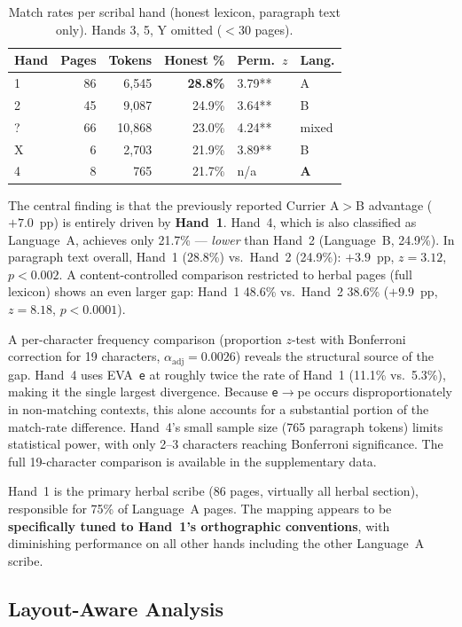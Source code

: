 \documentclass[11pt,a4paper]{article}
\newcommand{\eva}[1]{\texttt{#1}}
\begin{document}
\begin{table}[htbp]
\centering
\caption{Match rates per scribal hand (honest lexicon, paragraph text only).
Hands 3, 5, Y omitted ($<$30 pages).}
\label{tab:scribes}
\small
\begin{tabular}{@{}lrrrll@{}}
\toprule
Hand & Pages & Tokens & Honest \% & Perm.\ $z$ & Lang. \\
\midrule
1 & 86 & 6,545 & \textbf{28.8\%} & 3.79** & A \\
2 & 45 & 9,087 & 24.9\% & 3.64** & B \\
? & 66 & 10,868 & 23.0\% & 4.24** & mixed \\
X & 6 & 2,703 & 21.9\% & 3.89** & B \\
4 & 8 & 765 & 21.7\% & n/a & \textbf{A} \\
\bottomrule
\end{tabular}
\end{table}

The central finding is that the previously reported Currier A$>$B advantage
($+7.0$~pp) is entirely driven by \textbf{Hand~1}. Hand~4, which is also
classified as Language~A, achieves only 21.7\% --- \emph{lower} than Hand~2
(Language~B, 24.9\%). In paragraph text overall,
Hand~1 (28.8\%) vs.\ Hand~2 (24.9\%): $+3.9$~pp, $z=3.12$, $p<0.002$.
A content-controlled comparison restricted to herbal pages (full lexicon)
shows an even larger gap: Hand~1 48.6\% vs.\ Hand~2 38.6\%
($+9.9$~pp, $z=8.18$, $p<0.0001$).

A per-character frequency comparison (proportion $z$-test with Bonferroni
correction for 19 characters, $\alpha_{\mathrm{adj}} = 0.0026$)
reveals the structural source of the gap. Hand~4 uses EVA~\eva{e}
at roughly twice the rate of Hand~1 (11.1\% vs.\ 5.3\%), making it the
single largest divergence. Because \eva{e}$\to$pe occurs
disproportionately in non-matching contexts, this alone accounts for a
substantial portion of the match-rate difference. Hand~4's small sample
size (765 paragraph tokens) limits statistical power, with only 2--3
characters reaching Bonferroni significance. The full 19-character
comparison is available in the supplementary data.

Hand~1 is the primary herbal scribe (86 pages, virtually all herbal section),
responsible for 75\% of Language~A pages. The mapping appears to be
\textbf{specifically tuned to Hand~1's orthographic conventions}, with
diminishing performance on all other hands including the other Language~A
scribe.

\subsection{Layout-Aware Analysis}
\label{sec:layout}
\end{document}

